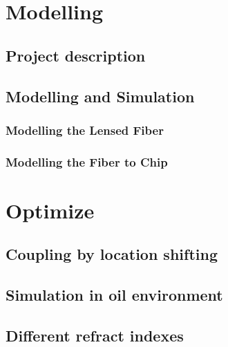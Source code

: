 \chapter{Modelling}
\label{chp:model}

\section{Project description}


\section{Modelling and Simulation}
\label{sect:model_simulation}

\subsection{Modelling the Lensed Fiber}
\label{sect:model_model_model_TLF}

\subsection{Modelling the Fiber to Chip}
\label{sect:model_model_fiber2chip}


%
\chapter{Optimize}
\label{chp:optim}


\section{Coupling by location shifting}
\label{sect:optim_shift}


\section{Simulation in oil environment}


\section{Different refract indexes}


